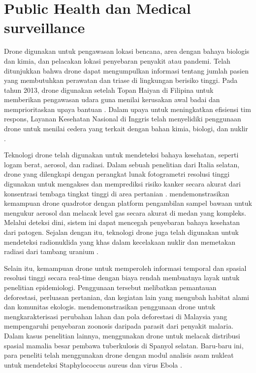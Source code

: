 \section{Public Health dan Medical surveillance}
\label{sec:publichealth}

Drone digunakan untuk pengawasan lokasi bencana, area dengan bahaya biologis dan kimia, dan pelacakan lokasi penyebaran penyakit atau pandemi.
Telah ditunjukkan bahwa drone dapat mengumpulkan informasi tentang jumlah pasien yang membutuhkan perawatan dan triase di lingkungan berisiko tinggi. Pada tahun 2013, drone digunakan setelah Topan Haiyan di Filipina untuk memberikan pengawasan udara guna menilai kerusakan awal badai dan memprioritaskan upaya bantuan \citep{hlad2015drones}. Dalam upaya untuk meningkatkan efisiensi tim respons, Layanan Kesehatan Nasional di Inggris telah menyelidiki penggunaan drone untuk menilai cedera yang terkait dengan bahan kimia, biologi, dan nuklir \citep{rosser2018surgical}. 

Teknologi drone telah digunakan untuk mendeteksi bahaya kesehatan, seperti logam berat, aerosol, dan radiasi. Dalam sebuah penelitian dari Italia selatan, drone yang dilengkapi dengan perangkat lunak fotogrametri resolusi tinggi digunakan untuk mengakses dan memprediksi risiko kanker secara akurat dari konsentrasi tembaga tingkat tinggi di area pertanian \citep{capolupo2015photogrammetry}. \citet{brady2016characterization} mendemonstrasikan kemampuan drone quadrotor dengan platform pengambilan sampel bawaan untuk mengukur aerosol dan melacak level gas secara akurat di medan yang kompleks. Melalui deteksi dini, sistem ini dapat mencegah penyebaran bahaya kesehatan dari patogen. Sejalan dengan itu, teknologi drone juga telah digunakan untuk mendeteksi radionuklida yang khas dalam kecelakaan nuklir dan memetakan radiasi dari tambang uranium \citep{tang2016efficiency} \citep{martin2015use}. 

Selain itu, kemampuan drone untuk memperoleh informasi temporal dan spasial resolusi tinggi secara real-time dengan biaya rendah membuatnya layak untuk penelitian epidemiologi. Penggunaan tersebut melibatkan pemantauan deforestasi, perluasan pertanian, dan kegiatan lain yang mengubah habitat alami dan komunitas ekologis. \citet{fornace2014mapping}
mendemonstrasikan penggunaan drone untuk mengkarakterisasi perubahan lahan dan pola deforestasi di Malaysia yang mempengaruhi penyebaran zoonosis daripada parasit dari penyakit malaria. Dalam kasus penelitian lainnya, \citet{barasona2014unmanned} menggunakan drone untuk melacak distribusi spasial mamalia besar pembawa tuberkulosis di Spanyol selatan. Baru-baru ini, para peneliti telah menggunakan drone dengan modul analisis asam nukleat untuk mendeteksi Staphylococcus aureus dan virus Ebola \citep{priye2016lab}.


